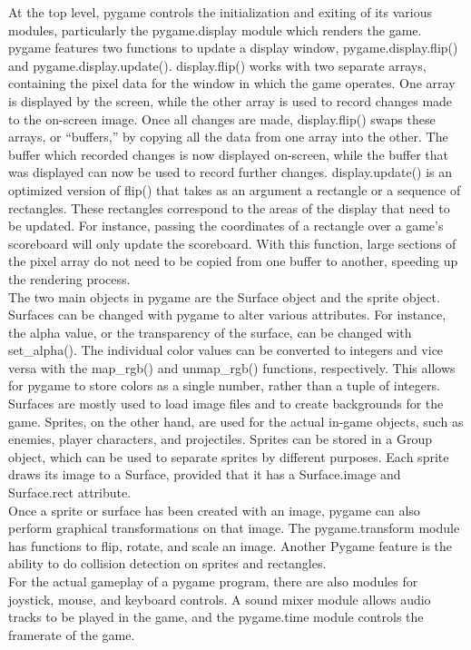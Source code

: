 At the top level, pygame controls the initialization and exiting of its various modules, particularly the pygame.display module which renders the game. pygame features two functions to update a display window, pygame.display.flip() and pygame.display.update(). display.flip() works with two separate arrays, containing the pixel data for the window in which the game operates. One array is displayed by the screen, while the other array is used to record changes made to the on-screen image. Once all changes are made, display.flip() swaps these arrays, or ``buffers,'' by copying all the data from one array into the other. The buffer which recorded changes is now displayed on-screen, while the buffer that was displayed can now be used to record further changes. display.update() is an optimized version of flip() that takes as an argument a rectangle or a sequence of rectangles. These rectangles correspond to the areas of the display that need to be updated. For instance, passing the coordinates of a rectangle over a game's scoreboard will only update the scoreboard. With this function, large sections of the pixel array do not need to be copied from one buffer to another, speeding up the rendering process.\\

The two main objects in pygame are the Surface object and the sprite object. Surfaces can be changed with pygame to alter various attributes. For instance, the alpha value, or the transparency of the surface, can be changed with set\_alpha(). The individual color values can be converted to integers and vice versa with the map\_rgb() and unmap\_rgb() functions, respectively. This allows for pygame to store colors as a single number, rather than a tuple of integers. Surfaces are mostly used to load image files and to create backgrounds for the game. Sprites, on the other hand, are used for the actual in-game objects, such as enemies, player characters, and projectiles. Sprites can be stored in a Group object, which can be used to separate sprites by different purposes. Each sprite draws its image to a Surface, provided that it has a Surface.image and Surface.rect attribute.\\

Once a sprite or surface has been created with an image, pygame can also perform graphical transformations on that image. The pygame.transform module has functions to flip, rotate, and scale an image. Another Pygame feature is the ability to do collision detection on sprites and rectangles.\\

For the actual gameplay of a pygame program, there are also modules for joystick, mouse, and keyboard controls. A sound mixer module allows audio tracks to be played in the game, and the pygame.time module controls the framerate of the game.
